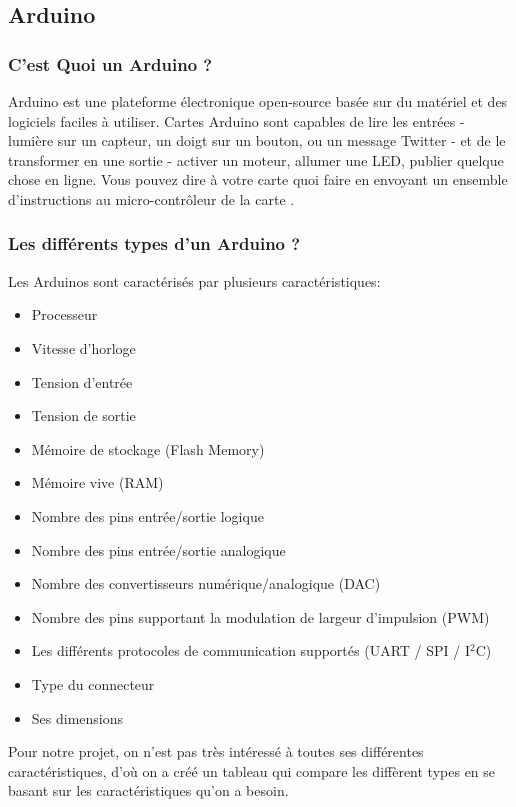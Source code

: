 \subsection{Arduino}

\subsubsection{C'est Quoi un Arduino ?}
Arduino est une plateforme électronique open-source basée sur du matériel et des logiciels faciles à utiliser. Cartes Arduino sont capables de lire les entrées - lumière sur un capteur, un doigt sur un bouton, ou un message Twitter - et de le transformer en une sortie - activer un moteur, allumer une LED, publier quelque chose en ligne. Vous pouvez dire à votre carte quoi faire en envoyant un ensemble d’instructions au micro-contrôleur de la carte \cite{arduino-introduction}.

\subsubsection{Les différents types d'un Arduino ?}
Les Arduinos sont caractérisés par plusieurs caractéristiques:

\begin{itemize}
    \item Processeur
    \item Vitesse d'horloge
    \item Tension d'entrée
    \item Tension de sortie
    \item Mémoire de stockage (Flash Memory)
    \item Mémoire vive (\acrshort{RAM})
    \item Nombre des pins entrée/sortie logique
    \item Nombre des pins entrée/sortie analogique
    \item Nombre des convertisseurs numérique/analogique (\acrshort{DAC})
    \item Nombre des pins supportant la modulation de largeur d'impulsion (\acrshort{PWM})
    \item Les différents protocoles de communication supportés (UART / SPI / I\(^2\)C)
    \item Type du connecteur
    \item Ses dimensions
\end{itemize}

Pour notre projet, on n'est pas très intéressé à toutes ses différentes caractéristiques, d'où on a créé un tableau qui compare les diffèrent types en se basant sur les caractéristiques qu'on a besoin.


